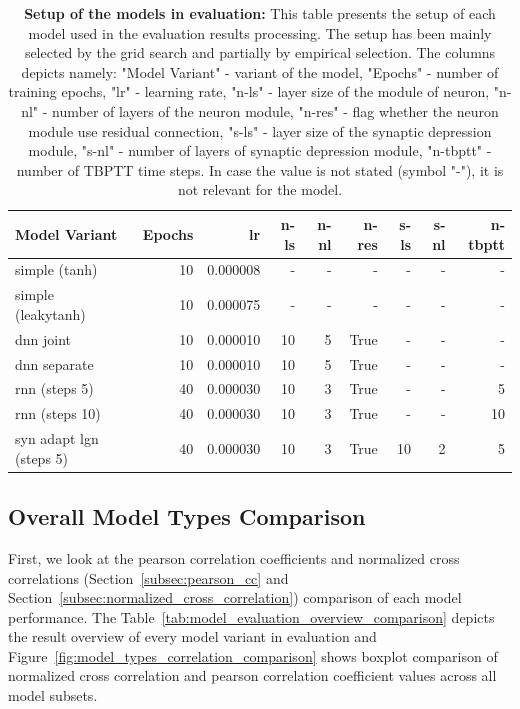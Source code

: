\begin{table}
    \centering\footnotesize\sf
    \begin{tabular}{lrrrrrrrr}
        \toprule
        Model Variant & Epochs & lr & n-ls & n-nl & n-res & s-ls & s-nl & n-tbptt \\
        \midrule
        simple (tanh) & 10 & 0.000008 & - & - & - & - & - & - \\
        simple (leakytanh) & 10 & 0.000075 & - & - & - & - & - & - \\
        dnn joint & 10 & 0.000010 & 10 & 5 & True & - & - & - \\
        dnn separate & 10 & 0.000010 & 10 & 5 & True & - & - & - \\
        rnn (steps 5) & 40 & 0.000030 & 10 & 3 & True & - & - & 5 \\
        rnn (steps 10) & 40 & 0.000030 & 10 & 3 & True & - & - & 10 \\
        syn adapt lgn (steps 5) & 40 & 0.000030 & 10 & 3 & True & 10 & 2 & 5 \\
        \bottomrule
        \end{tabular}
    \caption{\textbf{Setup of the models in evaluation:} This table presents the setup of each model used in the evaluation results processing. The setup has been mainly selected by the grid search and partially by empirical selection. The columns depicts namely: "Model Variant" - variant of the model, "Epochs" - number of training epochs, "lr" - learning rate, "n-ls" - layer size of the module of neuron, "n-nl" - number of layers of the neuron module, "n-res" - flag whether the neuron module use residual connection, "s-ls" - layer size of the synaptic depression module, "s-nl" - number of layers of synaptic depression module, "n-tbptt" - number of TBPTT time steps. In case the value is not stated (symbol "-"), it is not relevant for the model.}
    \label{tab:evaluation_setup}
\end{table}

\subsection{Overall Model Types Comparison}
\label{subsec:overall_model_types_comparison}
First, we look at the pearson correlation coefficients and normalized cross correlations (Section~\ref{subsec:pearson_cc} and Section~\ref{subsec:normalized_cross_correlation}) comparison of each model performance. The Table~\ref{tab:model_evaluation_overview_comparison} depicts the result overview of every model variant in evaluation and Figure~\ref{fig:model_types_correlation_comparison} shows boxplot comparison of normalized cross correlation and pearson correlation coefficient values across all model subsets.

